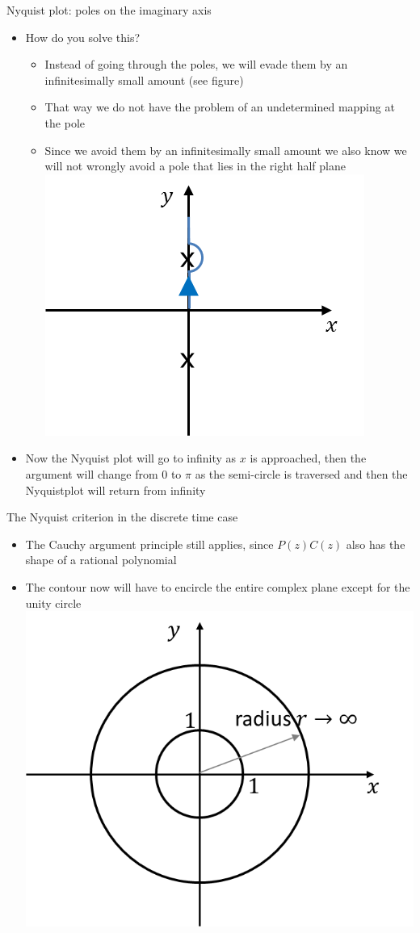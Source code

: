 \begin{frame}{Nyquist plot: poles on the imaginary axis}
\begin{itemize}
\item How do you solve this?
\begin{itemize}
\item Instead of going through the poles, we will evade them by an infinitesimally small amount (see figure)
\item That way we do not have the problem of an undetermined mapping at the pole
\item Since we avoid them by an infinitesimally small amount we also know we will not wrongly avoid a pole that lies in the right half plane
\\ \includegraphics[width=0.4\linewidth]{Afbeelding14}
\end{itemize}
\item Now the Nyquist plot will go to infinity as $x$ is approached, then the argument will change from $0$ to $\pi$ as the semi-circle is traversed and then the Nyquistplot will return from infinity
\end{itemize}
\end{frame}

\begin{frame}{The Nyquist criterion in the discrete time case}
\begin{itemize}
\item The Cauchy argument principle still applies, since $P(z)C(z)$ also has the shape of a rational polynomial
\item The contour now will have to encircle the entire complex plane except for the unity circle
\\ \includegraphics[width= 0.7\linewidth]{Afbeelding15}
\end{itemize}
\end{frame}

